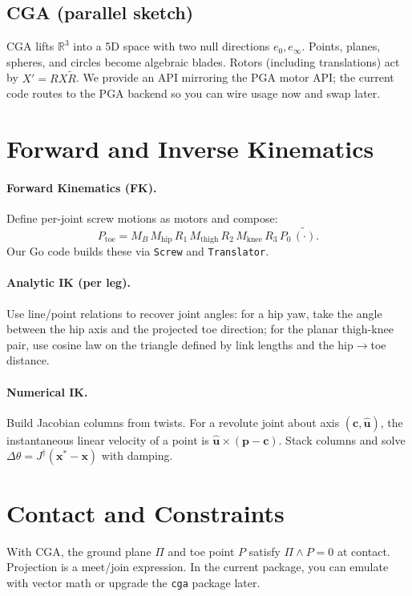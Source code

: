\documentclass[11pt]{article}
\begin{document}
\subsection{CGA (parallel sketch)}
CGA lifts $\mathbb{R}^3$ into a 5D space with two null directions $e_0, e_\infty$.
Points, planes, spheres, and circles become algebraic blades. Rotors (including translations) act by $X' = R X \tilde{R}$.
We provide an API mirroring the PGA motor API; the current code routes to the PGA backend so you can wire usage now and swap later.

\section{Forward and Inverse Kinematics}
\paragraph{Forward Kinematics (FK).}
Define per-joint screw motions as motors and compose:
\[
P_{\text{toe}} = M_B\, M_{\text{hip}}\, R_1\, M_{\text{thigh}}\, R_2\, M_{\text{knee}}\, R_3\, P_0\, \widetilde{(\cdot)}.
\]
Our Go code builds these via \verb|Screw| and \verb|Translator|.

\paragraph{Analytic IK (per leg).}
Use line/point relations to recover joint angles: for a hip yaw, take the angle between the hip axis and the projected toe direction; for the planar thigh-knee pair, use cosine law on the triangle defined by link lengths and the hip$\rightarrow$toe distance.

\paragraph{Numerical IK.}
Build Jacobian columns from twists. For a revolute joint about axis $(\mathbf{c}, \hat{\mathbf{u}})$, the instantaneous linear velocity of a point is $ \hat{\mathbf{u}} \times (\mathbf{p} - \mathbf{c})$. Stack columns and solve $\Delta \theta = J^\dagger (\mathbf{x}^* - \mathbf{x})$ with damping.

\section{Contact and Constraints}
With CGA, the ground plane $\Pi$ and toe point $P$ satisfy $\Pi \wedge P = 0$ at contact.
Projection is a meet/join expression. In the current package, you can emulate with vector math or upgrade the \verb|cga| package later.
\end{document}
